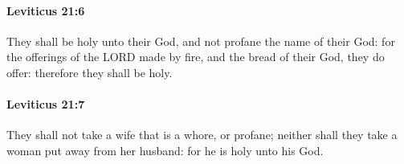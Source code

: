 		\paragraph{Leviticus 21:6} %
			\label{LEVITICUS-21-6}

			They shall be holy unto their God, and not profane the name of their God: for the offerings of the LORD made by fire, and the bread of their God, they do offer: therefore they shall be holy.


		\paragraph{Leviticus 21:7} %
			\label{LEVITICUS-21-7}

			They shall not take a wife that is a whore, or profane; neither shall they take a woman put away from her husband: for he is holy unto his God.


